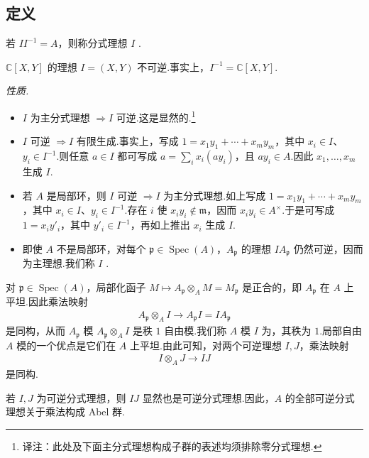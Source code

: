\subsection{定义}\label{sec:nt-3-2-2}
\begin{definition*}
若 $II^{-1}=A$，则称分式理想 $I$ .
\end{definition*}
\begin{example*}
$\mathbb C[X,Y]$ 的理想 $I=(X,Y)$ 不可逆.事实上，$I^{-1}=\mathbb C[X,Y]$.
\end{example*}
\emph{性质.}
\begin{itemize}
\item $I$ 为主分式理想 $\Rightarrow I$ 可逆.这是显然的.\footnote{译注：此处及下面主分式理想构成子群的表述均须排除零分式理想.}
\item $I$ 可逆 $\Rightarrow I$ 有限生成.事实上，写成 $1=x_1y_1+\cdots+x_my_m$，其中 $x_i\in I$、$y_i\in I^{-1}$.则任意 $a\in I$ 都可写成 $a=\sum_i x_i(ay_i)$，且 $ay_i\in A$.因此 $x_1,\ldots,x_m$ 生成 $I$.
\item 若 $A$ 是局部环，则 $I$ 可逆 $\Rightarrow I$ 为主分式理想.如上写成 $1=x_1y_1+\cdots+x_my_m$，其中 $x_i\in I$、$y_i\in I^{-1}$.存在 $i$ 使 $x_iy_i\notin\mathfrak m$，因而 $x_iy_i\in A^\times$.于是可写成 $1=x_iy'_i$，其中 $y'_i\in I^{-1}$，再如上推出 $x_i$ 生成 $I$.
\item 即使 $A$ 不是局部环，对每个 $\mathfrak p\in\operatorname{Spec}(A)$，$A_{\mathfrak p}$ 的理想 $IA_{\mathfrak p}$ 仍然可逆，因而为主理想.我们称 $I$ .
\end{itemize}
\begin{remark*}
对 $\mathfrak p\in\operatorname{Spec}(A)$，局部化函子 $M\mapsto A_{\mathfrak p}\otimes_A M=M_{\mathfrak p}$ 是正合的，即 $A_{\mathfrak p}$ 在 $A$ 上平坦.因此乘法映射
\begin{align*}
A_{\mathfrak p}\otimes_A I\longrightarrow A_{\mathfrak p}I=IA_{\mathfrak p}
\end{align*}
是同构，从而 $A_{\mathfrak p}$ 模 $A_{\mathfrak p}\otimes_A I$ 是秩 $1$ 自由模.我们称 $A$ 模 $I$ 为，其秩为 $1$.局部自由 $A$ 模的一个优点是它们在 $A$ 上平坦.由此可知，对两个可逆理想 $I,J$，乘法映射
\begin{align*}
I\otimes_A J\longrightarrow IJ
\end{align*}
是同构.
\end{remark*}
若 $I,J$ 为可逆分式理想，则 $IJ$ 显然也是可逆分式理想.因此，$A$ 的全部可逆分式理想关于乘法构成 Abel 群.
